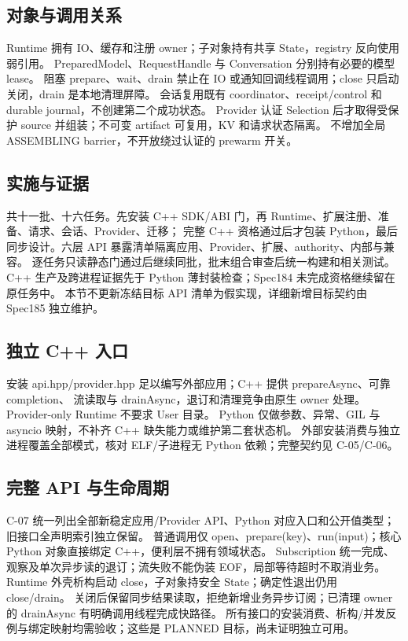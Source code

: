\subsection{对象与调用关系}
Runtime 拥有 IO、缓存和注册 owner；子对象持有共享 State，registry 反向使用弱引用。
PreparedModel、RequestHandle 与 Conversation 分别持有必要的模型 lease。
阻塞 prepare、wait、drain 禁止在 IO 或通知回调线程调用；close 只启动关闭，drain 是本地清理屏障。
会话复用既有 coordinator、receipt/control 和 durable journal，不创建第二个成功状态。
Provider 认证 Selection 后才取得受保护 source 并组装；不可变 artifact 可复用，KV 和请求状态隔离。
不增加全局 ASSEMBLING barrier，不开放绕过认证的 prewarm 开关。

\subsection{实施与证据}
共十一批、十六任务。先安装 C++ SDK/ABI 门，再 Runtime、扩展注册、准备、请求、会话、Provider、迁移；
完整 C++ 资格通过后才包装 Python，最后同步设计。六层 API 暴露清单隔离应用、Provider、扩展、authority、内部与兼容。
逐任务只读静态门通过后继续同批，批末组合审查后统一构建和相关测试。
C++ 生产及跨进程证据先于 Python 薄封装检查；Spec184 未完成资格继续留在原任务中。
本节不更新冻结目标 API 清单为假实现，详细新增目标契约由 Spec185 独立维护。

\subsection{独立 C++ 入口}
安装 api.hpp/provider.hpp 足以编写外部应用；C++ 提供 prepareAsync、可靠 completion、
流读取与 drainAsync，退订和清理竞争由原生 owner 处理。Provider-only Runtime 不要求 User 目录。
Python 仅做参数、异常、GIL 与 asyncio 映射，不补齐 C++ 缺失能力或维护第二套状态机。
外部安装消费与独立进程覆盖全部模式，核对 ELF/子进程无 Python 依赖；完整契约见 C-05/C-06。

\subsection{完整 API 与生命周期}
C-07 统一列出全部新稳定应用/Provider API、Python 对应入口和公开值类型；旧接口全声明索引独立保留。
普通调用仅 open、prepare(key)、run(input)；核心 Python 对象直接绑定 C++，便利层不拥有领域状态。
Subscription 统一完成、观察及单次异步读的退订；流失败不能伪装 EOF，局部等待超时不取消业务。
Runtime 外壳析构启动 close，子对象持安全 State；确定性退出仍用 close/drain。
关闭后保留同步结果读取，拒绝新增业务异步订阅；已清理 owner 的 drainAsync 有明确调用线程完成快路径。
所有接口的安装消费、析构/并发反例与绑定映射均需验收；这些是 PLANNED 目标，尚未证明独立可用。

